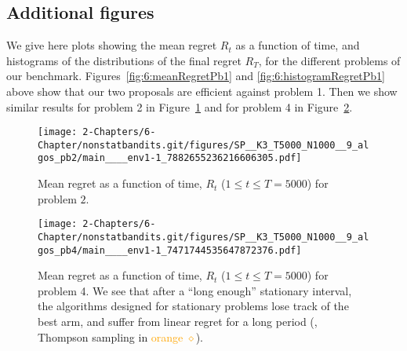\subsection{Additional figures}\label{app:6:moreFigures}

We give here plots showing the mean regret $R_t$ as a function of time, and histograms of the distributions of the final regret $R_T$, for the different problems of our benchmark.
%
Figures~\ref{fig:6:meanRegretPb1} and \ref{fig:6:histogramRegretPb1} above show that our two proposals are efficient against problem 1.
Then we show similar results for problem 2 in Figure~\ref{fig:6:meanRegretPb2}
and for problem 4 in Figure~\ref{fig:6:meanRegretPb4}.


\begin{figure}[h!]  %
    \centering
    \texttt{[image: 2-Chapters/6-Chapter/nonstatbandits.git/figures/SP\_\_K3\_T5000\_N1000\_\_9\_algos\_pb2/main\_\_\_\_env1-1\_7882655236216606305.pdf]}
    \caption{Mean regret as a function of time, $R_t$ ($1 \leq t \leq T = 5000$) for problem $2$.}
    \label{fig:6:meanRegretPb2}
\end{figure}

\begin{figure}[h!]  %
    \centering
    \texttt{[image: 2-Chapters/6-Chapter/nonstatbandits.git/figures/SP\_\_K3\_T5000\_N1000\_\_9\_algos\_pb4/main\_\_\_\_env1-1\_7471744535647872376.pdf]}
    \caption{Mean regret as a function of time, $R_t$ ($1 \leq t \leq T = 5000$) for problem 4. We see that after a ``long enough'' stationary interval, the algorithms designed for stationary problems lose track of the best arm, and suffer from linear regret for a long period (\eg, Thompson sampling in \textcolor{orange}{orange $\diamond$}).}
    \label{fig:6:meanRegretPb4}
\end{figure}


